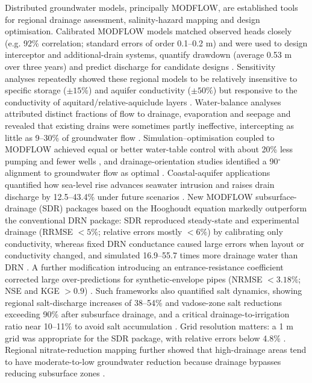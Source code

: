 Distributed groundwater models, principally MODFLOW, are established tools for regional drainage assessment, salinity-hazard mapping and design optimisation. Calibrated MODFLOW models matched observed heads closely (e.g. 92\% correlation; standard errors of order 0.1--0.2 m) and were used to design interceptor and additional-drain systems, quantify drawdown (average 0.53 m over three years) and predict discharge for candidate designs \parencite{Ghorbani2016,Mirlas2012,Mirlas2009,Mirlas2013,Mirlas2021,AbdElaziz2025}. Sensitivity analyses repeatedly showed these regional models to be relatively insensitive to specific storage ($\pm15\%$) and aquifer conductivity ($\pm50\%$) but responsive to the conductivity of aquitard/relative-aquiclude layers \parencite{Mirlas2012,Mirlas2009,Mirlas2013}. Water-balance analyses attributed distinct fractions of flow to drainage, evaporation and seepage and revealed that existing drains were sometimes partly ineffective, intercepting as little as 9--30\% of groundwater flow \parencite{Mirlas2009,Mirlas2012}. Simulation--optimisation coupled to MODFLOW achieved equal or better water-table control with about 20\% less pumping and fewer wells \parencite{Rana2008}, and drainage-orientation studies identified a 90$^{\circ}$ alignment to groundwater flow as optimal \parencite{AbdElaziz2025}. Coastal-aquifer applications quantified how sea-level rise advances seawater intrusion and raises drain discharge by 12.5--43.4\% under future scenarios \parencite{AbdElaty2019}. New MODFLOW subsurface-drainage (SDR) packages based on the Hooghoudt equation markedly outperform the conventional DRN package: SDR reproduced steady-state and experimental drainage (RRMSE $<5\%$; relative errors mostly $<6\%$) by calibrating only conductivity, whereas fixed DRN conductance caused large errors when layout or conductivity changed, and simulated 16.9--55.7 times more drainage water than DRN \parencite{Yang2022b,Han2025}. A further modification introducing an entrance-resistance coefficient corrected large over-predictions for synthetic-envelope pipes (NRMSE $<3.18\%$; NSE and KGE $>0.9$) \parencite{Qian2025b}. Such frameworks also quantified salt dynamics, showing regional salt-discharge increases of 38--54\% and vadose-zone salt reductions exceeding 90\% after subsurface drainage, and a critical drainage-to-irrigation ratio near 10--11\% to avoid salt accumulation \parencite{Yang2022b,Han2025}. Grid resolution matters: a 1 m grid was appropriate for the SDR package, with relative errors below 4.8\% \parencite{Han2025}. Regional nitrate-reduction mapping further showed that high-drainage areas tend to have moderate-to-low groundwater reduction because drainage bypasses reducing subsurface zones \parencite{Hojberg2017,Hansen2019}.

